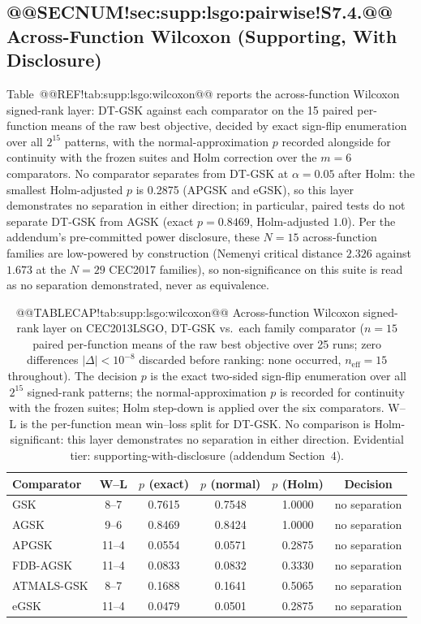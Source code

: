 \documentclass[10pt,a4paper]{article}
\newcommand{\dtgsk}{DT-GSK}
\newcommand{\agsk}{AGSK}
\newcommand{\apgsk}{APGSK}
\newcommand{\egsk}{eGSK}
\begin{document}
\subsection{@@SECNUM!sec:supp:lsgo:pairwise!S7.4.@@ Across-Function Wilcoxon (Supporting, With Disclosure)}\label{sec:supp:lsgo:pairwise}

Table~@@REF!tab:supp:lsgo:wilcoxon@@ reports the across-function Wilcoxon
signed-rank layer: \dtgsk{} against each comparator on the 15 paired
per-function means of the raw best objective, decided by exact sign-flip
enumeration over all $2^{15}$ patterns, with the normal-approximation $p$
recorded alongside for continuity with the frozen suites and Holm
correction over the $m = 6$ comparators.  No comparator separates from
\dtgsk{} at $\alpha = 0.05$ after Holm: the smallest Holm-adjusted
$p$ is 0.2875 (\apgsk{} and \egsk{}), so this layer demonstrates no
separation in either direction; in particular, paired tests do not
separate \dtgsk{} from \agsk{} (exact $p = 0.8469$, Holm-adjusted $1.0$).
Per the addendum's pre-committed power disclosure, these $N = 15$
across-function families are low-powered by construction (Nemenyi
critical distance $2.326$ against $1.673$ at the $N = 29$ CEC2017
families), so non-significance on this suite is read as no separation
demonstrated, never as equivalence.


\begin{table}[H]
\caption{@@TABLECAP!tab:supp:lsgo:wilcoxon@@ Across-function Wilcoxon signed-rank layer on CEC2013LSGO,
\dtgsk{} vs.\ each family comparator ($n = 15$ paired per-function
means of the raw best objective over 25 runs; zero differences
$|\Delta| < 10^{-8}$ discarded before ranking: none occurred,
$n_{\mathrm{eff}} = 15$ throughout).  The decision $p$ is the exact
two-sided sign-flip enumeration over all $2^{15}$ signed-rank patterns;
the normal-approximation $p$ is recorded for continuity with the frozen
suites; Holm step-down is applied over the six comparators.  W--L is the
per-function mean win--loss split for \dtgsk{}.  No comparison is
Holm-significant: this layer demonstrates no separation in either
direction.  Evidential tier: supporting-with-disclosure (addendum
Section~4).
}\label{tab:supp:lsgo:wilcoxon}

\zebra
\begin{tabular}{lccccc}
\toprule
\textbf{Comparator} & \textbf{W--L} & \textbf{$p$ (exact)} &
\textbf{$p$ (normal)} & \textbf{$p$ (Holm)} & \textbf{Decision} \\
\midrule
GSK & 8--7 & 0.7615 & 0.7548 & 1.0000 & no separation \\
AGSK & 9--6 & 0.8469 & 0.8424 & 1.0000 & no separation \\
APGSK & 11--4 & 0.0554 & 0.0571 & 0.2875 & no separation \\
FDB-AGSK & 11--4 & 0.0833 & 0.0832 & 0.3330 & no separation \\
ATMALS-GSK & 8--7 & 0.1688 & 0.1641 & 0.5065 & no separation \\
eGSK & 11--4 & 0.0479 & 0.0501 & 0.2875 & no separation \\
\bottomrule
\end{tabular}
\end{table}
\end{document}
